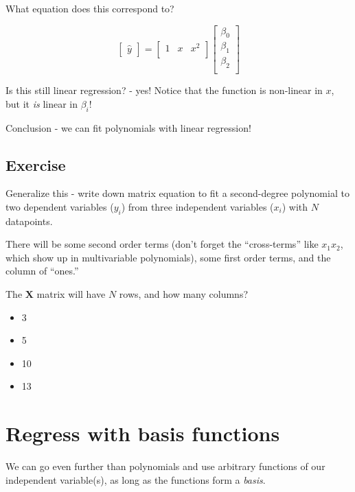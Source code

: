 \documentclass[11pt]{article}
\newcommand\xmtx{\boldsymbol{X}}
\newcommand\yhat{\hat{y}}
\begin{document}
What equation does this correspond to?

\begin{equation}
    \begin{bmatrix}
        \yhat 
    \end{bmatrix} = 
    \begin{bmatrix}
        1 & x & x^2 \\
    \end{bmatrix}
    \begin{bmatrix}
        \beta_0 \\
        \beta_1 \\
        \beta_2 \\
    \end{bmatrix}
\end{equation}

Is this still linear regression? - yes!
Notice that the function is non-linear in $x$, but it \emph{is} linear
in $\beta_i$!

Conclusion - we can fit polynomials with linear regression!

\subsection{ Exercise }

Generalize this - write down matrix equation to fit a second-degree
polynomial to two dependent variables ($y_i$) from three independent
variables ($x_i$) with $N$ datapoints. 

There will be some second order terms (don't forget
the ``cross-terms'' like $x_1 x_2$, which show up in multivariable
polynomials), some first order terms, and the column of ``ones.''

The $\xmtx$ matrix will have $N$ rows, and how many columns?

\begin{itemize}
    \item  3
    \item  5
    \item 10 
    \item 13 
\end{itemize}

\section{ Regress with basis functions }

We can go even further than polynomials and use arbitrary functions of
our independent variable(s), as long as the functions form a
\emph{basis}.
\end{document}
